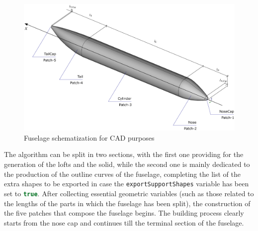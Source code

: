 %
\begin{figure}[H]
\centering
\includegraphics[scale=0.22]{Immagini/Capitolo3/fuselage_1}
\caption{Fuselage schematization for CAD purposes}
\label{fig:FusInfographic}
\end{figure}
%

\bigskip
\noindent
The algorithm can be split in two sections, with the first one providing for the generation of the lofts and the solid, while the second one is mainly dedicated to the production of the outline curves of the fuselage, completing the list of the extra shapes to be exported in case the \lstinline[language=Java]!exportSupportShapes! variable has been set to \lstinline[language=Java]!true!. After collecting essential geometric variables (such as those related to the lengths of the parts in which the fuselage has been split), the construction of the five patches that compose the fuselage begins. The building process clearly starts from the nose cap and continues till the terminal section of the fuselage.

